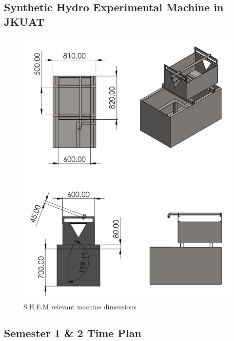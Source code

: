 \subsection{Synthetic Hydro Experimental Machine in JKUAT}
\begin{figure}[H]
    \centering
    \includegraphics[height=.8\textheight, width=\textwidth]{Figures/MainReservoir.PNG}
    \caption{S.H.E.M relevant machine dimensions}
\end{figure}



\subsection{Semester 1 \& 2 Time Plan}

